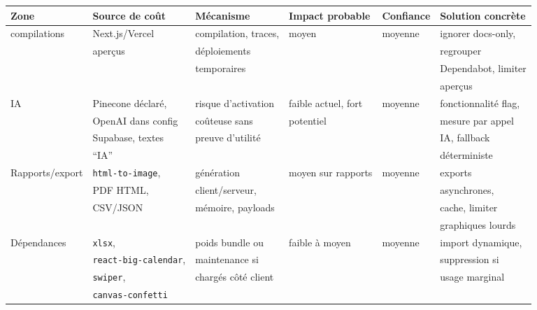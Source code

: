\documentclass[
  10pt,
  a4paper,
  DIV=11,
  numbers=noendperiod,
  oneside]{scrreprt}
\newcounter{none} %
\begin{document}
{\def\LTcaptype{none} %
\begin{longtable}[]{@{}
  >{\raggedright\arraybackslash}p{}
  >{\raggedright\arraybackslash}p{}
  >{\raggedright\arraybackslash}p{}
  >{\raggedright\arraybackslash}p{}
  >{\raggedright\arraybackslash}p{}
  >{\raggedright\arraybackslash}p{}@{}}
\toprule\noalign{}
\begin{minipage}[b]{\linewidth}\raggedright
Zone
\end{minipage} & \begin{minipage}[b]{\linewidth}\raggedright
Source de coût
\end{minipage} & \begin{minipage}[b]{\linewidth}\raggedright
Mécanisme
\end{minipage} & \begin{minipage}[b]{\linewidth}\raggedright
Impact probable
\end{minipage} & \begin{minipage}[b]{\linewidth}\raggedright
Confiance
\end{minipage} & \begin{minipage}[b]{\linewidth}\raggedright
Solution concrète
\end{minipage} \\
\midrule\noalign{}
\endhead
\bottomrule\noalign{}
\endlastfoot
compilations & Next.js/Vercel & compilation, traces, & moyen & moyenne &
ignorer docs-only, \\
& aperçus & déploiements & & & regrouper \\
& & temporaires & & & Dependabot, limiter \\
& & & & & aperçus \\
IA & Pinecone déclaré, & risque d'activation & faible actuel, fort &
moyenne & fonctionnalité flag, \\
& OpenAI dans config & coûteuse sans & potentiel & & mesure par appel \\
& Supabase, textes & preuve d'utilité & & & IA, fallback \\
& ``IA'' & & & & déterministe \\
Rapports/export & \texttt{html-to-image}, & génération & moyen sur
rapports & moyenne & exports \\
& PDF HTML, & client/serveur, & & & asynchrones, \\
& CSV/JSON & mémoire, payloads & & & cache, limiter \\
& & & & & graphiques lourds \\
Dépendances & \texttt{xlsx}, & poids bundle ou & faible à moyen &
moyenne & import dynamique, \\
& \texttt{react-big-calendar}, & maintenance si & & & suppression si \\
& \texttt{swiper}, & chargés côté client & & & usage marginal \\
& \texttt{canvas-confetti} & & & & \\
\end{longtable}
}
\end{document}
